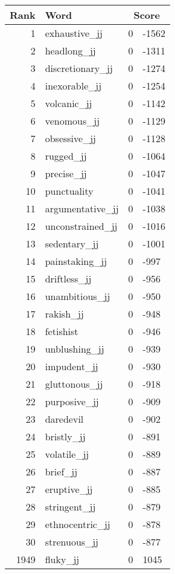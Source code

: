 \begin{longtable}[!htbp]{| rlr@{.}l |}
    \hline
    \textbf{Rank} & \textbf{Word} & \multicolumn{2}{c|}{\textbf{Score}} \\
    \hline
    \endhead
    1 & exhaustive\_jj & 0 & -1562 \\
    2 & headlong\_jj & 0 & -1311 \\
    3 & discretionary\_jj & 0 & -1274 \\
    4 & inexorable\_jj & 0 & -1254 \\
    5 & volcanic\_jj & 0 & -1142 \\
    6 & venomous\_jj & 0 & -1129 \\
    7 & obsessive\_jj & 0 & -1128 \\
    8 & rugged\_jj & 0 & -1064 \\
    9 & precise\_jj & 0 & -1047 \\
    10 & punctuality & 0 & -1041 \\
    11 & argumentative\_jj & 0 & -1038 \\
    12 & unconstrained\_jj & 0 & -1016 \\
    13 & sedentary\_jj & 0 & -1001 \\
    14 & painstaking\_jj & 0 & -997 \\
    15 & driftless\_jj & 0 & -956 \\
    16 & unambitious\_jj & 0 & -950 \\
    17 & rakish\_jj & 0 & -948 \\
    18 & fetishist & 0 & -946 \\
    19 & unblushing\_jj & 0 & -939 \\
    20 & impudent\_jj & 0 & -930 \\
    21 & gluttonous\_jj & 0 & -918 \\
    22 & purposive\_jj & 0 & -909 \\
    23 & daredevil & 0 & -902 \\
    24 & bristly\_jj & 0 & -891 \\
    25 & volatile\_jj & 0 & -889 \\
    26 & brief\_jj & 0 & -887 \\
    27 & eruptive\_jj & 0 & -885 \\
    28 & stringent\_jj & 0 & -879 \\
    29 & ethnocentric\_jj & 0 & -878 \\
    30 & strenuous\_jj & 0 & -877 \\
    1949 & fluky\_jj & 0 & 1045 \\

\end{longtable}
